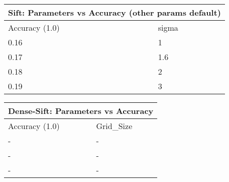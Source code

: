 \documentclass[12pt]{article}
\begin{document}
    \vspace*{0.5cm}
    \begin{tabular}{ |p{1.5cm}||p{2cm}| }
        \hline
        \multicolumn{2}{|c|}{Sift: Parameters vs Accuracy (other params default)} \\
        \hline
        Accuracy (1.0) & sigma \\
        \hline
        0.16 & 1 \\
        \hline
        0.17 & 1.6 \\
        \hline
        0.18 & 2 \\
        \hline
        0.19 & 3 \\
        \hline
    \end{tabular}

    \vspace*{0.5cm}
        \begin{tabular}{ |p{1.5cm}||p{3cm}|  }
            \hline
            \multicolumn{2}{|c|}{Dense-Sift: Parameters vs Accuracy} \\
            \hline
            Accuracy (1.0) & Grid\_Size \\
            \hline
            - & - \\
            \hline
            - & - \\
            \hline
            - & - \\
            \hline
        \end{tabular}
\end{document}
